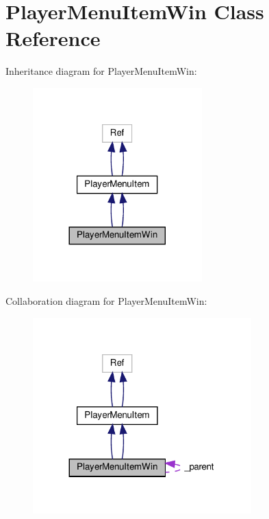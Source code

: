 \hypertarget{classPlayerMenuItemWin}{}\section{Player\+Menu\+Item\+Win Class Reference}
\label{classPlayerMenuItemWin}


Inheritance diagram for Player\+Menu\+Item\+Win\+:
\nopagebreak
\begin{figure}[H]
\begin{center}
\leavevmode
\includegraphics[width=185pt]{classPlayerMenuItemWin__inherit__graph}
\end{center}
\end{figure}


Collaboration diagram for Player\+Menu\+Item\+Win\+:
\nopagebreak
\begin{figure}[H]
\begin{center}
\leavevmode
\includegraphics[width=239pt]{classPlayerMenuItemWin__coll__graph}
\end{center}
\end{figure}
